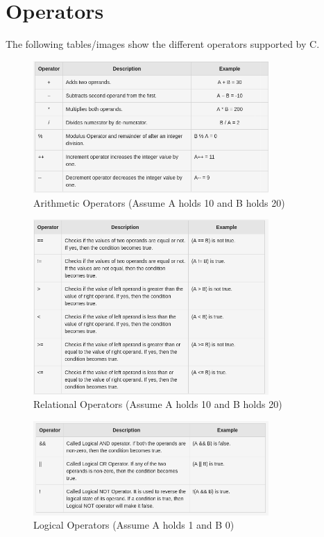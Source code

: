 \documentclass[a4paper, 11pt]{article}
\begin{document}
\section{Operators}

The following tables/images show the different operators supported by C. 



\begin{figure}[htb!]
    \centering
    \includegraphics[width=0.8\textwidth]{arith_oper}
    \caption{Arithmetic Operators (Assume A holds 10 and B holds 20)}
    \label{fig:arith_oper}
\end{figure}

\newpage

\begin{figure}[htb!]
    \centering
    \includegraphics[width=0.8\textwidth]{relat_oper}
    \caption{Relational Operators (Assume A holds 10 and B holds 20)}
    \label{fig:relat_oper}
\end{figure}

\begin{figure}[htb!]
    \centering
    \includegraphics[width=0.8\textwidth]{log_oper}
    \caption{Logical Operators (Assume A holds 1 and B 0)}
    \label{fig:log_oper}
\end{figure}
\end{document}
